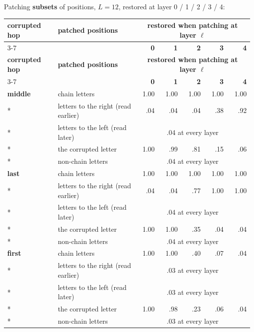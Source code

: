 \documentclass[paper=a4,fontsize=11pt,DIV=11,parskip=half,headings=small,numbers=noendperiod]{scrartcl}
\DeclareRobustCommand{\hdr}[1]{\textsf{\bfseries #1}}
\begin{document}
Patching \textbf{subsets} of positions, $L=12$, restored at layer 0 / 1 / 2 / 3 / 4:

{\small\nopagebreak[4]
\begin{longtable}{@{}l >{\raggedright\arraybackslash}p{5.4cm} *{5}{r}@{}}
\toprule
\hdr{corrupted hop} & \hdr{patched positions} & \multicolumn{5}{c}{\hdr{restored when patching at layer $\ell$}} \\
\cmidrule(lr){3-7}
 & & \hdr{0} & \hdr{1} & \hdr{2} & \hdr{3} & \hdr{4} \\
\midrule
\endfirsthead
\toprule
\hdr{corrupted hop} & \hdr{patched positions} & \multicolumn{5}{c}{\hdr{restored when patching at layer $\ell$}} \\
\cmidrule(lr){3-7}
 & & \hdr{0} & \hdr{1} & \hdr{2} & \hdr{3} & \hdr{4} \\
\midrule
\endhead
\bottomrule
\endlastfoot
\textbf{middle} & chain letters & 1.00 & 1.00 & 1.00 & 1.00 & 1.00 \\*
 & letters to the right (read earlier) & .04 & .04 & .04 & .38 & .92 \\*
 & letters to the left (read later) & \multicolumn{5}{c}{.04 at every layer} \\*
 & the corrupted letter & 1.00 & .99 & .81 & .15 & .06 \\*
 & non-chain letters & \multicolumn{5}{c}{.04 at every layer} \\
\addlinespace[4pt]
\textbf{last} & chain letters & 1.00 & 1.00 & 1.00 & 1.00 & 1.00 \\*
 & letters to the right (read earlier) & .04 & .04 & .77 & 1.00 & 1.00 \\*
 & letters to the left (read later) & \multicolumn{5}{c}{.04 at every layer} \\*
 & the corrupted letter & 1.00 & 1.00 & .35 & .04 & .04 \\*
 & non-chain letters & \multicolumn{5}{c}{.04 at every layer} \\
\addlinespace[4pt]
\textbf{first} & chain letters & 1.00 & 1.00 & .40 & .07 & .04 \\*
 & letters to the right (read earlier) & \multicolumn{5}{c}{.03 at every layer} \\*
 & letters to the left (read later) & \multicolumn{5}{c}{.03 at every layer} \\*
 & the corrupted letter & 1.00 & .98 & .23 & .06 & .04 \\*
 & non-chain letters & \multicolumn{5}{c}{.03 at every layer} \\
\end{longtable}}
\end{document}
